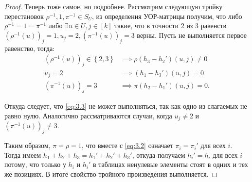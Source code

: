 \begin{proof}
  Теперь тоже самое, но подробнее. Рассмотрим следующую тройку перестановок $\rho^{-1}, 1, \pi^{-1} \in S_U$, из определения УОР-матрицы получим, что либо $\rho^{-1}= 1= \pi^{-1}$ либо $\exists u \in U, j \in [k]$ такие, что в точности 2 из 3 равенств $(\rho^{-1}(u))_j=1, u_j=2, (\pi^{-1}(u))_j=3$ верны. Пусть не выполняется первое равенство, тогда:
  \begin{align*}
  		(\rho^{-1}(u))_j \in \left\{ 2,3 \right\} & \implies \rho(h_3-h_2')(u,j) \neq 0\\
  		u_j = 2 & \implies (h_1 - h_3')(u,j) = 0\\
  		(\pi^{-1}(u))_j=3 & \implies \pi(h_2 - h_1')(u,j) = 0.
  \end{align*}
  
  Откуда следует, что \eqref{eq:3.3} не может выполняться, так как одно из слагаемых не равно нулю. Аналогично рассматриваются случаи, когда $u_j \neq 2$ и $(\pi^{-1}(u))_j \neq 3$.
  
  Таким образом, $\pi=\rho=1$, что вместе с \eqref{eq:3.2} означает $\pi_i = \pi_i'$ для всех $i$. Тогда имеем $h_1+h_2+h_3=h_1'+h_2'+h_3'$, откуда получаем $h_i'=h_i$ для всех $i$ потому, что только у $h_i$ и $h_i'$ в таблицах ненулевые элементы стоят в одних и тех же позициях. В итоге свойство тройного произведения выполняется.
\end{proof}

